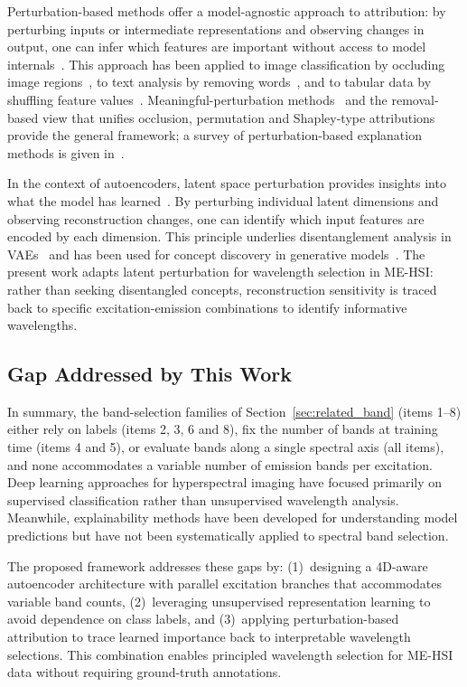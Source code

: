 Perturbation-based methods offer a model-agnostic approach to attribution: by perturbing inputs or intermediate representations and observing changes in output, one can infer which features are important without access to model internals~\cite{zeiler2014visualizing}.
This approach has been applied to image classification by occluding image regions~\cite{zeiler2014visualizing}, to text analysis by removing words~\cite{li2016understanding}, and to tabular data by shuffling feature values~\cite{fisher2019all}.
Meaningful-perturbation methods~\cite{fong2017perturbation} and the removal-based view that unifies occlusion, permutation and Shapley-type attributions~\cite{covert2021removing} provide the general framework; a survey of perturbation-based explanation methods is given in~\cite{ivanovs2021perturbation}.

In the context of autoencoders, latent space perturbation provides insights into what the model has learned~\cite{higgins2017beta}.
By perturbing individual latent dimensions and observing reconstruction changes, one can identify which input features are encoded by each dimension.
This principle underlies disentanglement analysis in VAEs~\cite{chen2018isolating} and has been used for concept discovery in generative models~\cite{voynov2020unsupervised}.
The present work adapts latent perturbation for wavelength selection in ME-HSI: rather than seeking disentangled concepts, reconstruction sensitivity is traced back to specific excitation-emission combinations to identify informative wavelengths.

\subsection{Gap Addressed by This Work}
\label{sec:related_summary}

In summary, the band-selection families of Section~\ref{sec:related_band} (items 1--8) either rely on labels (items 2, 3, 6 and 8), fix the number of bands at training time (items 4 and 5), or evaluate bands along a single spectral axis (all items), and none accommodates a variable number of emission bands per excitation.
Deep learning approaches for hyperspectral imaging have focused primarily on supervised classification rather than unsupervised wavelength analysis.
Meanwhile, explainability methods have been developed for understanding model predictions but have not been systematically applied to spectral band selection.

The proposed framework addresses these gaps by: (1)~designing a 4D-aware autoencoder architecture with parallel excitation branches that accommodates variable band counts, (2)~leveraging unsupervised representation learning to avoid dependence on class labels, and (3)~applying perturbation-based attribution to trace learned importance back to interpretable wavelength selections.
This combination enables principled wavelength selection for ME-HSI data without requiring ground-truth annotations.